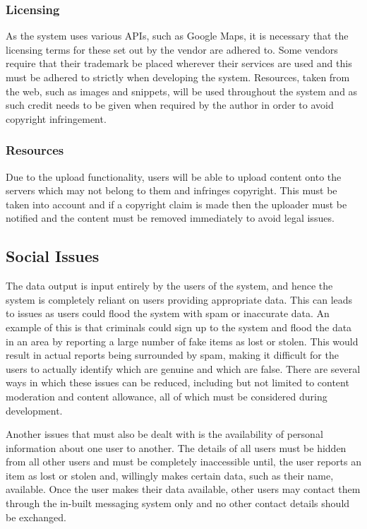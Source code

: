 \subsubsection{Licensing}
As the system uses various APIs, such as Google Maps, it is necessary that the licensing terms for these set out by the vendor are adhered to. Some vendors require that their trademark be placed wherever their services are used and this must be adhered to strictly when developing the system. Resources, taken from the web, such as images and snippets, will be used throughout the system and as such credit needs to be given when required by the author in order to avoid copyright infringement.

\subsubsection{Resources}
Due to the upload functionality, users will be able to upload content onto the servers which may not belong to them and infringes copyright. This must be taken into account and if a copyright claim is made then the uploader must be notified and the content must be removed immediately to avoid legal issues.

\subsection{Social Issues} \label{Section:Social_Issues}
The data output is input entirely by the users of the system, and hence the system is completely reliant on users providing appropriate data. This can leads to issues as users could flood the system with spam or inaccurate data. An example of this is that criminals could sign up to the system and flood the data in an area by reporting a large number of fake items as lost or stolen. This would result in actual reports being surrounded by spam, making it difficult for the users to actually identify which are genuine and which are false. There are several ways in which these issues can be reduced, including but not limited to content moderation and content allowance, all of which must be considered during development.

Another issues that must also be dealt with is the availability of personal information about one user to another. The details of all users must be hidden from all other users and must be completely inaccessible until, the user reports an item as lost or stolen and, willingly makes certain data, such as their name, available. Once the user makes their data available, other users may contact them through the in-built messaging system only and no other contact details should be exchanged.

